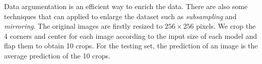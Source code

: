 Data argumentation is an efficient way to enrich the data. There are also some techniques that can applied to enlarge the dataset such as \emph{subsampling} and \emph{mirroring}. The original images are firstly resized to $256\times 256$ pixels. We crop the 4 corners and center for each image according to the input size of each model and flap them to obtain 10 crops. For the testing set, the prediction of an image is the average prediction of the 10 crops.
